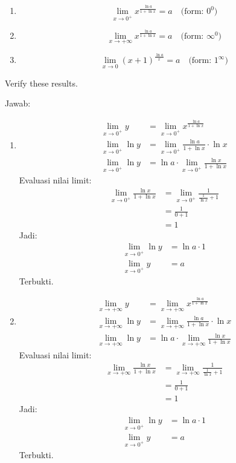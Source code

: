 \documentclass[12pt, letterpaper]{article}
\begin{document}
\begin{enumerate}
    \begin{enumerate}
        \item 
        \[
        \lim_{x \to 0^+} x^{\frac{\ln a}{1 + \ln x}} = a \quad \text{(form: } 0^0 \text{)}
        \]
    
        \item 
        \[
        \lim_{x \to +\infty} x^{\frac{\ln a}{1 + \ln x}} = a \quad \text{(form: } \infty^0 \text{)}
        \]
    
        \item 
        \[
        \lim_{x \to 0} (x + 1)^{\frac{\ln a}{x}} = a \quad \text{(form: } 1^\infty \text{)}
        \]
    \end{enumerate}
    Verify these results.

    Jawab:
    \begin{enumerate}
        \item 
        \begin{align*}
            \lim_{x \to 0^+} y &= \lim_{x \to 0^+} x^{\frac{\ln a}{1 + \ln x}} \\
        \lim_{x \to 0^+} \ln y &= \lim_{x \to 0^+} \frac{\ln a}{1 + \ln x} \cdot \ln x \\
        \lim_{x \to 0^+} \ln y &= \ln a \cdot \lim_{x \to 0^+} \frac{\ln x}{1 + \ln x}
        \end{align*}
        Evaluasi nilai limit:
        \begin{align*}
        \lim_{x \to 0^+} \frac{\ln x}{1 + \ln x} &= \lim_{x \to 0^+} \frac{1}{\frac{1}{\ln x} + 1} \\
        &= \frac{1}{0+1} \\
        &= 1
        \end{align*}
        Jadi:
        \begin{align*}
        \lim_{x \to 0^+} \ln y &= \ln a \cdot 1 \\
            \lim_{x \to 0^+} y &= a
        \end{align*}
        Terbukti.
        
        \item 
        \begin{align*}
            \lim_{x \to +\infty} y &= \lim_{x \to +\infty} x^{\frac{\ln a}{1 + \ln x}} \\
        \lim_{x \to +\infty} \ln y &= \lim_{x \to +\infty} \frac{\ln a}{1 + \ln x} \cdot \ln x \\
        \lim_{x \to +\infty} \ln y &= \ln a \cdot \lim_{x \to +\infty} \frac{\ln x}{1 + \ln x}
        \end{align*}
        Evaluasi nilai limit:
        \begin{align*}
        \lim_{x \to +\infty} \frac{\ln x}{1 + \ln x} &= \lim_{x \to +\infty} \frac{1}{\frac{1}{\ln x} + 1} \\
        &= \frac{1}{0+1} \\
        &= 1
        \end{align*}
        Jadi:
        \begin{align*}
        \lim_{x \to 0^+} \ln y &= \ln a \cdot 1 \\
            \lim_{x \to 0^+} y &= a
        \end{align*}
        Terbukti.
    

\end{enumerate}
\end{enumerate}
\end{document}
